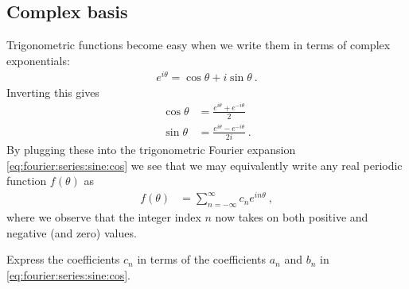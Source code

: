 \subsection{Complex basis}
Trigonometric functions become easy when we write them in terms of complex exponentials:
\begin{align}
    e^{i\theta} = \cos\theta + i \sin\theta \ .
\end{align}
Inverting this gives
\begin{align}
    \cos\theta &= \frac{e^{i\theta} + e^{-i\theta}}{2}
    \\
    \sin\theta &= \frac{e^{i\theta} - e^{-i\theta}}{2i} 
    \ .
\end{align}
By plugging these into the trigonometric Fourier expansion \eqref{eq:fourier:series:sine:cos} we see that we may equivalently write any real periodic function $f(\theta)$ as
\begin{align}
    f(\theta) &= \sum_{n=-\infty}^\infty
    c_n e^{in\theta} \ ,
    \label{eq:fourier:complex:series}
\end{align}
where we observe that the integer index $n$ now takes on both positive and negative (and zero) values. 
\begin{exercise}
Express the coefficients $c_n$ in terms of the coefficients $a_n$ and $b_n$ in  \eqref{eq:fourier:series:sine:cos}.
\end{exercise}

